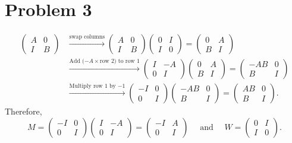 \documentclass[11pt]{article}
\theoremstyle{plain}
\theoremstyle{definition}
\theoremstyle{remark}
\begin{document}
\section*{Problem 3}
\begin{align*}
    \begin{pmatrix}
        A & 0
        \\I & B
    \end{pmatrix} &\xrightarrow{\text{swap columns}} 
    \begin{pmatrix}
        A & 0
        \\I & B
    \end{pmatrix}
    \begin{pmatrix}
        0 & I
        \\I & 0
    \end{pmatrix}
    =
    \begin{pmatrix}
        0 & A
        \\B & I
    \end{pmatrix}
    \\&\xrightarrow{\text{Add ($-A\times$row $2$) to row $1$}} 
    \begin{pmatrix}
        I & -A
        \\0 & I
    \end{pmatrix}
    \begin{pmatrix}
        0 & A
        \\B & I
    \end{pmatrix}
    =
    \begin{pmatrix}
        -AB & 0
        \\B & I
    \end{pmatrix} 
    \\&\xrightarrow{\text{Multiply row $1$ by $-1$}} 
    \begin{pmatrix}
        -I & 0
        \\0 & I
    \end{pmatrix} 
    \begin{pmatrix}
        -AB & 0
        \\B & I
    \end{pmatrix} 
    =
    \begin{pmatrix}
        AB & 0
        \\B & I
    \end{pmatrix}.
\end{align*}
Therefore,
$$
    M = \begin{pmatrix}
        -I & 0
        \\0 & I
    \end{pmatrix} \begin{pmatrix}
        I & -A
        \\0 & I
    \end{pmatrix}
    =\begin{pmatrix}
        -I & A
        \\0 & I
    \end{pmatrix}
    \quad \text{ and } \quad
    W = \begin{pmatrix}
        0 & I
        \\I & 0
    \end{pmatrix} .
$$
\end{document}
